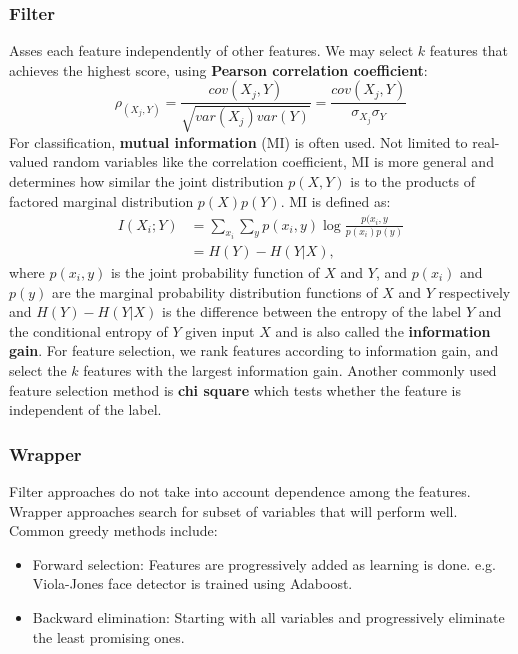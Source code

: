 \documentclass{article}
\begin{document}
   \subsubsection{Filter}
   Asses each feature independently of other features. We may select $k$ features that achieves the highest score, using \textbf{Pearson correlation coefficient}:
   \begin{equation}
   \rho_(X_j, Y) = \frac{cov(X_j, Y)}{\sqrt{var(X_j)var(Y)}} = \frac{cov(X_j, Y)}{\sigma_{X_j} \sigma_{Y}}
   \end{equation}
   For classification, \textbf{mutual information} (MI) is often used. Not limited to real-valued random variables like the correlation coefficient, MI is more general and determines how similar the joint distribution $p(X,Y)$ is to the products of factored marginal distribution $p(X)p(Y)$. MI is defined as:
   \begin{align}
   I(X_i;Y) &= \sum_{x_i} \sum_{y} p(x_i, y) \log \frac{p(x_i, y}{p(x_i)p(y)} \\
   			&= H(Y) - H(Y|X),
   \end{align}
   where $p(x_i,y)$ is the joint probability function of $X$ and $Y$, and $p(x_i)$ and $p(y)$ are the marginal probability distribution functions of $X$ and $Y$ respectively and $H(Y) - H(Y|X)$ is the difference between the entropy of the label $Y$ and the conditional entropy of $Y$ given input $X$ and is also called the \textbf{information gain}. For feature selection, we rank features according to information gain, and select the $k$ features with the largest information gain. Another commonly used feature selection method is \textbf{chi square} which tests whether the feature is independent of the label.
   
   \subsubsection{Wrapper}
   Filter approaches do not take into account dependence among the features. Wrapper approaches search for subset of variables that will perform well. Common greedy methods include:
   \begin{itemize}
   \item Forward selection: Features are progressively added as learning is done. e.g. Viola-Jones face detector is trained using Adaboost.
   \item Backward elimination: Starting with all variables and progressively eliminate the least promising ones.
   \end{itemize}
   
\end{document}
